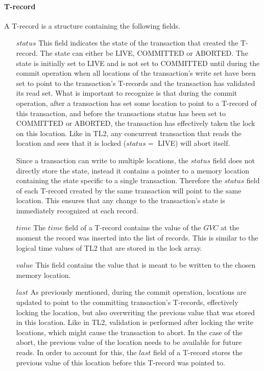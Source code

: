 \documentclass[11pt,letterpaper]{article}
\begin{document}
\paragraph{T-record}
A T-record is a structure containing the following fields.
\begin{itemize}
\vspace{-0.1cm}
\item[$\mathit{status}$]
This  field  indicates  the  state  of the  transaction  that  created  the
T-record. The  
state can either be LIVE, COMMITTED or ABORTED.
The state is initially set to LIVE and is not set to COMMITTED until during the commit operation when 
all locations of the transaction's write set have been set to point to the transaction's T-records
and the transaction has validated its read set.
What is important to recognize is that during the commit operation, after a transaction has set some location to point to a T-record
of this transaction, and before the transactions status has been set to COMMITTED or ABORTED, the transaction has effectively
taken the lock on this location.
Like in TL2, any concurrent transaction that reads the location and sees that it is locked ($\mathit{status} = $ LIVE) will
abort itself.

Since a transaction can write to multiple locations, the $\mathit{status}$ field
does not directly store the state, instead it contains a
pointer to a memory location containing the state specific to a single transaction.
Therefore the $\mathit{status}$ field of each T-record created by the same transaction will point to the same location.
This ensures that any change to the transaction's state is immediately recognized at each record.
\vspace{-0.2cm}
\item[$\mathit{time}$]
The  $\mathit{time}$  field of  a T-record  contains the  
value of  the $\mathit{GVC}$  at  the  moment the  record  was 
inserted  into the  list of   records.
This is similar to the logical time values of TL2 that are stored in the lock array.
\vspace{-0.2cm}
\item[$\mathit{value}$]
This field contains the value that is meant to be written to the chosen 
memory location.
\vspace{-0.2cm}
\item[$\mathit{last}$]
As previously mentioned, during the commit operation, locations are updated to point
to the committing transaction's T-records, effectively locking the location, but also overwriting the previous value
that was stored in this location.
Like in TL2, validation is performed after locking the write locations, which might cause the transaction to abort.
In the case of the abort, the previous value of the location needs to be available for future reads.
In order to account for this, the $\mathit{last}$ field of a T-record
stores the previous value of this location before this T-record was pointed to.

\end{itemize}
\end{document}
